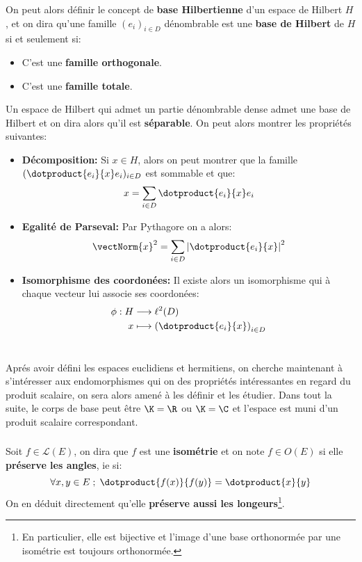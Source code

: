 \subsection*{}
On peut alors définir le concept de \textbf{base Hilbertienne} d'un espace de Hilbert \( H \), et on dira qu'une famille \( (e_i)_{i \in D} \) dénombrable est une \textbf{base de Hilbert} de \( H \) si et seulement si:
\begin{itemize}
   \item C'est une \textbf{famille orthogonale}.
   \item C'est une \textbf{famille totale}.
\end{itemize}
Un espace de Hilbert qui admet un partie dénombrable dense admet une base de Hilbert et on dira alors qu'il est \textbf{séparable}. On peut alors montrer les propriétés suivantes:
\begin{itemize}
   \item \textbf{Décomposition:} Si \( x \in H \), alors on peut montrer que la famille \( (\dotproduct{e_i}{x}e_i)_{i \in D} \) est sommable et que:
   \[ 
      x = \sum_{i \in D}\dotproduct{e_i}{x}e_i
   \]
   \item \textbf{Egalité de Parseval:} Par Pythagore on a alors:
   \[ 
      \vectNorm{x}^2 = \sum_{i \in D} \left|\dotproduct{e_i}{x}\right|^2
   \]
   \item \textbf{Isomorphisme des coordonées:} Il existe alors un isomorphisme qui à chaque vecteur lui associe ses coordonées:
   \[ 
      \begin{aligned}
         \phi : H &\longrightarrow \ell^2(D) \\
         x &\longmapsto \left(\dotproduct{e_i}{x}\right)_{i \in D}
      \end{aligned}
   \]
\end{itemize}
\chapter*{}
Aprés avoir défini les espaces euclidiens et hermitiens, on cherche maintenant à s'intéresser aux endomorphismes qui on des propriétés intéressantes en regard du produit scalaire, on sera alors amené à les définir et les étudier. Dans tout la suite, le corps de base peut être \(\K = \R\) ou \(\K = \C\) et l'espace est muni d'un produit scalaire correspondant.
\subsection*{}
Soit \(f \in \mathcal{L}(E)\), on dira que \(f\) est une \textbf{isométrie} et on note \(f \in O(E)\) si elle \textbf{préserve les angles}, ie si:
\[
   \forall x, y \in E \; ; \; \dotproduct{f(x)}{f(y)} = \dotproduct{x}{y}   
\]
On en déduit directement qu'elle \textbf{préserve aussi les longeurs}\footnote[1]{En particulier, elle est bijective et l'image d'une base orthonormée par une isométrie est toujours orthonormée.}.\<

